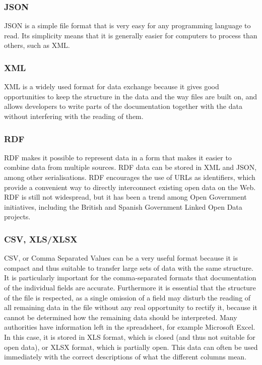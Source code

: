 \documentclass[thesis=B,english]{FITthesis}[2012/06/26]
\begin{document}
	 	\subsubsection*{JSON}
	 	JSON is a simple file format that is very easy for any programming language to read. Its simplicity means that it is generally easier for computers to process than others, such as XML.
	 	\subsubsection*{XML}
	 	XML is a widely used format for data exchange because it gives good opportunities to keep the structure in the data and the way files are built on, and allows developers to write parts of the documentation together with the data without interfering with the reading of them.
	 	\subsubsection*{RDF} 	
		RDF makes it possible to represent data in a form that makes it easier to combine data from multiple sources. RDF data can be stored in XML and JSON, among other serialisations. RDF encourages the use of URLs as identifiers, which provide a convenient way to directly interconnect existing open data on the Web. RDF is still not widespread, but it has been a trend among Open Government initiatives, including the British and Spanish Government Linked Open Data projects.
		\subsubsection{CSV, XLS/XLSX}
		CSV, or Comma Separated Values can be a very useful format because it is compact and thus suitable to transfer large sets of data with the same structure. It is particularly important for the comma-separated formats that documentation of the individual fields are accurate.
Furthermore it is essential that the structure of the file is respected, as a single omission of a field may disturb the reading of all remaining data in the file without any real opportunity to rectify it, because it cannot be determined how the remaining data should be interpreted.
Many authorities have information left in the spreadsheet, for example Microsoft Excel. In this case, it is stored in XLS format, which is closed (and thus not suitable for open data), or XLSX format, which is partially open. This data can often be used immediately with the correct descriptions of what the different columns mean.
\end{document}
